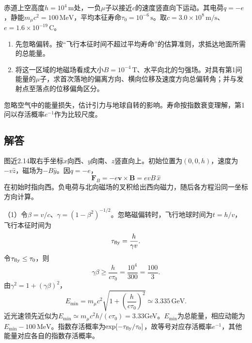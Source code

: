 \documentclass[UTF8,fontset=fandol,a4paper,11pt]{ctexart}
\newcommand{\figcaption}[1]{\par\vspace{2pt}{\small\color{muted}#1}\par}
\begin{document}
赤道上空高度$h=10^4\,\mathrm m$处，一负$\mu$子以接近$c$的速度竖直向下运动。其电荷$q=-e$，静能$m_\mu c^2=100\,\mathrm{MeV}$，平均本征寿命$\tau_0=10^{-6}\,\mathrm s$。取$c=3.0\times10^8\,\mathrm{m/s}$、$e=1.6\times10^{-19}\,\mathrm C$。
\begin{enumerate}
\item 先忽略偏转。按“飞行本征时间不超过平均寿命”的估算准则，求抵达地面所需的总能量。
\item 将这一区域的地磁场看成大小$B=10^{-4}\,\mathrm T$、水平向北的匀强场。对具有第1问能量的$\mu$子，求首次落地的偏离方向、横向位移及速度方向总偏转角；并与发射点至落点的位移偏角区分。
\end{enumerate}
忽略空气中的能量损失，估计引力与地球自转的影响。寿命按指数衰变理解，第1问以存活概率$e^{-1}$作为比较尺度。

\begin{center}\begin{minipage}{.98\linewidth}\centering
{}
\figcaption{图近2.14\quad 初始洛伦兹力向西，磁场指向xz图面之外。}
\end{minipage}\end{center}

\subsection*{解答}


图近2.14取右手坐标$x$向西、$y$向南、$z$竖直向上。初始位置为$(0,0,h)$，速度为$-v\hat z$，磁场为$-B\hat y$。因$q=-e$，
\[
\boldsymbol F_B=-e\boldsymbol v\times\boldsymbol B
=evB\,\hat x
\]
在初始时指向西。负电荷与北向磁场的叉积给出西向磁力，随后各方程沿同一坐标方向计算。

（1）令$\beta=v/c$、$\gamma=(1-\beta^2)^{-1/2}$。忽略磁偏转时，飞行地球时间为$t=h/v$，飞行本征时间为
\[
\tau_{\rm fly}=\frac h{\gamma v}.
\]
令$\tau_{\rm fly}\le\tau_0$，则
\[
\gamma\beta\ge\frac h{c\tau_0}=\frac{10^4}{300}
=\frac{100}{3}.
\]
由$\gamma^2=1+(\gamma\beta)^2$，
\[
\boxed{E_{\min}=m_\mu c^2
\sqrt{1+\left(\frac h{c\tau_0}\right)^2}
\simeq3.335\,\mathrm{GeV}}.
\]
近光速领先近似为$E_{\min}\simeq m_\mu c^2h/(c\tau_0)=3.33$GeV。$E_{\min}$为总能量，相应动能为$E_{\min}-100\,\mathrm{MeV}$。指数存活概率为$\exp[-\tau_{\rm fly}/\tau_0]$，故等号对应存活概率$e^{-1}$，其他能量对应各自的指数存活概率。
\end{document}
